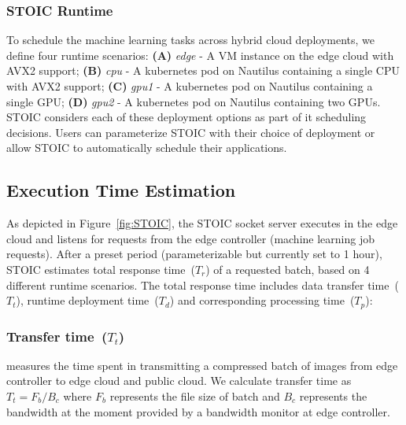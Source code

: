  \BlankLine
 \subsubsection{STOIC Runtime}
 To schedule the machine learning tasks across hybrid cloud deployments, we define four runtime scenarios: \textbf{(A)} \textit{edge} - A VM instance on the edge cloud with AVX2 support; \textbf{(B)} \textit{cpu} - A kubernetes pod on Nautilus containing a single CPU with AVX2 support; \textbf{(C)} \textit{gpu1} - A kubernetes pod on Nautilus containing a single GPU; \textbf{(D)} \textit{gpu2} - A kubernetes pod on Nautilus containing two GPUs. STOIC considers each of these deployment options as part of it scheduling decisions. Users can parameterize STOIC with their choice of deployment or allow STOIC to automatically schedule their applications.
 
 
 
 \subsection{Execution Time Estimation}
 As depicted in Figure~\ref{fig:STOIC}, the STOIC socket server executes in the edge cloud and listens for requests from the edge controller (machine learning job requests). After a preset period (parameterizable but currently set to 1 hour), STOIC estimates total response time~($T_r$) of a requested batch, based on 4 different runtime scenarios. The total response time includes data transfer time~($T_t$), runtime deployment time~($T_d$) and corresponding processing time~($T_p$):
 
 \subsubsection{Transfer time~($T_t$)} measures the time spent in transmitting a compressed batch of images from edge controller to edge cloud and public cloud. We calculate transfer time as ${T_t = F_b / B_c}$ where $F_b$ represents the file size of batch and $B_c$ represents the bandwidth at the moment provided by a bandwidth monitor at edge controller. 
 
